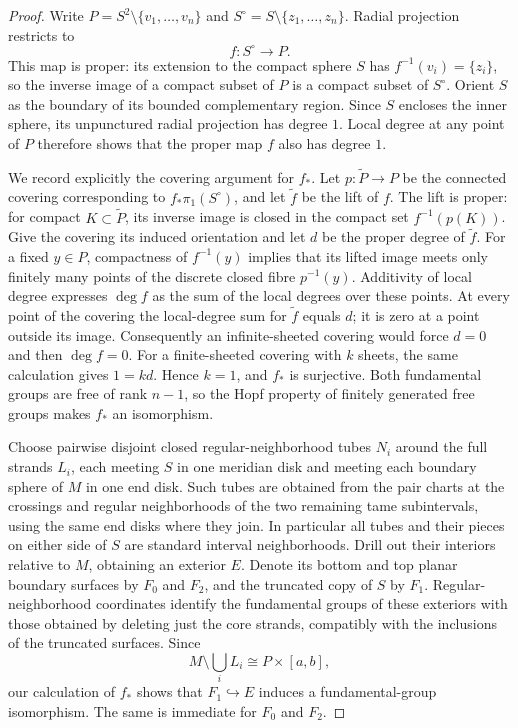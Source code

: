 \begin{proof}
Write $P=S^2\setminus\{v_1,\ldots,v_n\}$ and
$S^\circ=S\setminus\{z_1,\ldots,z_n\}$.  Radial projection restricts to
\[
 f:S^\circ\longrightarrow P.
\]
This map is proper: its extension to the compact sphere $S$ has
$f^{-1}(v_i)=\{z_i\}$, so the inverse image of a compact subset of $P$
is a compact subset of $S^\circ$.  Orient $S$ as the boundary of its
bounded complementary region.  Since $S$ encloses the inner sphere,
its unpunctured radial projection has degree $1$.  Local degree at any
point of $P$ therefore shows that the proper map $f$ also has degree $1$.

We record explicitly the covering argument for $f_*$.  Let
$p:\widetilde P\to P$ be the connected covering corresponding to
$f_*\pi_1(S^\circ)$, and let $\widetilde f$ be the lift of $f$.
The lift is proper: for compact $K\subset\widetilde P$, its inverse
image is closed in the compact set $f^{-1}(p(K))$.
Give the covering its induced orientation and let $d$ be the proper
degree of $\widetilde f$.  For a fixed $y\in P$, compactness of
$f^{-1}(y)$ implies that its lifted image meets only finitely many
points of the discrete closed fibre $p^{-1}(y)$.  Additivity of local
degree expresses $\deg f$ as the sum of the local degrees over these
points.  At every point of the covering the local-degree sum for
$\widetilde f$ equals $d$; it is zero at a point outside its image.
Consequently an infinite-sheeted covering would force $d=0$ and then
$\deg f=0$.  For a finite-sheeted covering with $k$ sheets, the same
calculation gives $1=k d$.  Hence $k=1$, and $f_*$ is surjective.
Both fundamental groups are free of rank $n-1$, so the Hopf property
of finitely generated free groups \cite[III.A, Complements~18--19]{deLaHarpe2000} makes $f_*$ an isomorphism.

Choose pairwise disjoint closed regular-neighborhood tubes $N_i$
around the full strands $L_i$, each meeting $S$ in one meridian disk
and meeting each boundary sphere of $M$ in one end disk.  Such tubes
are obtained from the pair charts at the crossings and regular
neighborhoods of the two remaining tame subintervals, using the same
end disks where they join.  In particular all tubes and their pieces
on either side of $S$ are standard interval neighborhoods.
Drill out their interiors relative to $M$, obtaining an exterior $E$.
Denote its bottom and top planar boundary surfaces by $F_0$ and $F_2$,
and the truncated copy of $S$ by $F_1$.
Regular-neighborhood coordinates identify the fundamental groups of
these exteriors with those obtained by deleting just the core
strands, compatibly with the inclusions of the truncated surfaces.
Since
\[
 M\setminus\bigcup_iL_i\cong P\times[a,b],
\]
our calculation of $f_*$ shows that $F_1\hookrightarrow E$ induces a
fundamental-group isomorphism.  The same is immediate for $F_0$ and
$F_2$.


\end{proof}
